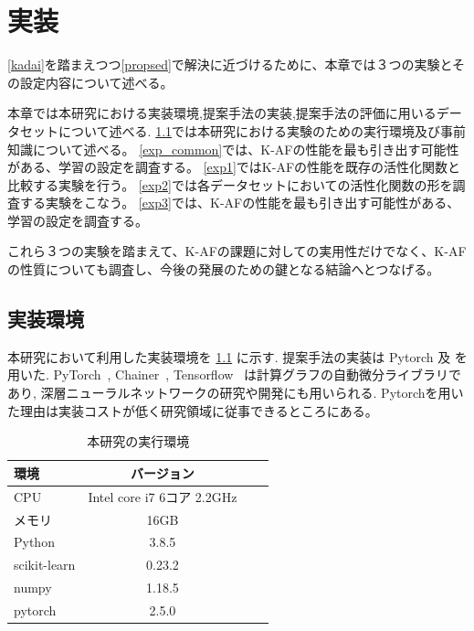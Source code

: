 \chapter{実装}
\label{implementation}

\ref{kadai}を踏まえつつ\ref{propsed}で解決に近づけるために、本章では３つの実験とその設定内容について述べる。

本章では本研究における実装環境,提案手法の実装,提案手法の評価に用いるデータセットについて述べる.
\ref{impl_env}では本研究における実験のための実行環境及び事前知識について述べる。
\ref{exp_common}では、K-AFの性能を最も引き出す可能性がある、学習の設定を調査する。
\ref{exp1}ではK-AFの性能を既存の活性化関数と比較する実験を行う。
\ref{exp2}では各データセットにおいての活性化関数の形を調査する実験をこなう。
\ref{exp3}では、K-AFの性能を最も引き出す可能性がある、学習の設定を調査する。

これら３つの実験を踏まえて、K-AFの課題に対しての実用性だけでなく、K-AFの性質についても調査し、今後の発展のための鍵となる結論へとつなげる。



\section{実装環境}
\label{impl_env}



本研究において利用した実装環境を \ref{impl_table} に示す. 提案手法の実装は Pytorch 及
を用いた.  PyTorch~\cite{pytorch}, Chainer~\cite{chainer},  Tensorflow~\cite{tensorflow} は計算グラフの自動微分ライブラリであり, 深層ニューラルネットワークの研究や開発にも用いられる.
Pytorchを用いた理由は実装コストが低く研究領域に従事できるところにある。


\begin{table}[htbp]
\label{impl_table}
    \begin{center}
        \caption{本研究の実行環境}
        \vspace{5mm} 
        \begin{tabular}{l*{2}{c}r}
        環境              & バージョン \\
        \hline
        CPU               & Intel core i7 6コア 2.2GHz \\
        メモリ             & 16GB \\
        Python            & 3.8.5  \\
        scikit-learn      & 0.23.2\\
        numpy             & 1.18.5 \\
        pytorch           & 2.5.0 \\
        \end{tabular}
    \end{center}
\end{table}



